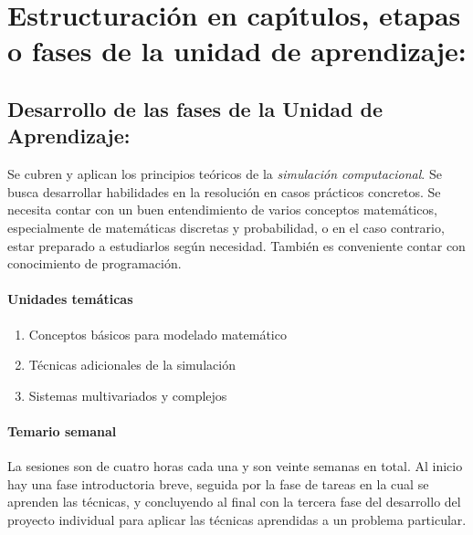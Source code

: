 \section{Estructuraci\'{o}n en cap\'{\i}tulos, etapas o fases de la unidad de
  aprendizaje:}
\subsection{Desarrollo de las fases de la Unidad de Aprendizaje:}

\quad

Se cubren y aplican los principios te\'{o}ricos de la {\em
  simulaci\'{o}n computacional}. Se busca desarrollar habilidades en
la resoluci\'{o}n en casos pr\'{a}cticos concretos. Se necesita contar
con un buen entendimiento de varios conceptos matem\'{a}ticos,
especialmente de matem\'{a}ticas discretas y probabilidad, o en el
caso contrario, estar preparado a estudiarlos seg\'{u}n
necesidad. Tambi\'{e}n es conveniente contar con conocimiento de
programaci\'{o}n.

\paragraph{Unidades tem\'{a}ticas}

\begin{enumerate}[itemsep=-3pt]
\item Conceptos b\'{a}sicos para modelado matem\'{a}tico
\item T\'{e}cnicas adicionales de la simulaci\'{o}n
\item Sistemas multivariados y complejos
\end{enumerate}

\newpage

\paragraph{Temario semanal}

\quad

La sesiones son de cuatro horas cada una y son veinte semanas en
total. Al inicio hay una fase introductoria breve, seguida por la fase de
tareas en la cual se aprenden las t\'{e}cnicas, y concluyendo al final
con la tercera fase del desarrollo del proyecto individual para
aplicar las t\'{e}cnicas aprendidas a un problema particular.

